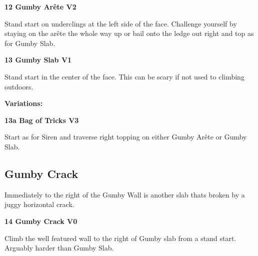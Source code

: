 	\begin{multicols}{2}


\needspace{1.5cm}
\label{rt:Gumby Arête}
\colorbox{green!20}{
\parbox{0.95\linewidth}{
\textbf{
12 Gumby Arête V2  
}}}
\begin{adjustwidth}{0.5cm}{}			
Stand start on underclings at the left side of the face. Challenge yourself by staying on the arête the whole way up or bail onto the ledge out right and top as for Gumby Slab.
\end{adjustwidth}




\needspace{1.5cm}
\label{rt:Gumby Slab}
\colorbox{green!20}{
\parbox{0.95\linewidth}{
\textbf{
13 Gumby Slab V1  
}}}
\begin{adjustwidth}{0.5cm}{}			
Stand start in the center of the face. This can be scary if not used to climbing outdoors.
\end{adjustwidth}


\begin{adjustwidth}{0.5cm}{}				
\needspace{3cm}
\textbf{Variations:} \newline

\needspace{1.5cm}
\label{vr:Bag of Tricks}
\colorbox{green!20}{
\parbox{0.95\linewidth}{
\textbf{
13a Bag of Tricks V3  
}}}
\begin{adjustwidth}{0.5cm}{}			
Start as for Siren and traverse right topping on either Gumby Arête or Gumby Slab.
\end{adjustwidth}



\end{adjustwidth}



\needspace{1.5cm}
\subsection*{Gumby Crack}\label{bf:Gumby Crack}
Immediately to the right of the Gumby Wall is another slab thats broken by a juggy horizontal crack.\\
	


\needspace{1.5cm}
\label{rt:Gumby Crack}
\colorbox{green!20}{
\parbox{0.95\linewidth}{
\textbf{
14 Gumby Crack V0  
}}}
\begin{adjustwidth}{0.5cm}{}			
Climb the well featured wall to the right of Gumby slab from a stand start. Arguably harder than Gumby Slab.
\end{adjustwidth}






\end{multicols}
